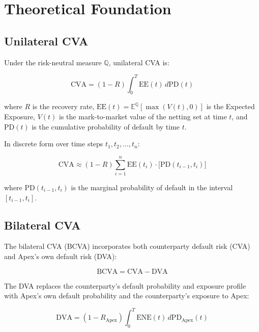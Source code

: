 \documentclass[11pt,a4paper]{article}
\begin{document}
\section{Theoretical Foundation}

\subsection{Unilateral CVA}

Under the risk-neutral measure $\mathbb{Q}$, unilateral CVA is:

\begin{equation}
  \text{CVA} = (1 - R) \int_0^T \text{EE}(t)\, d\text{PD}(t)
  \label{eq:cva_continuous}
\end{equation}

where $R$ is the recovery rate, $\text{EE}(t) = \mathbb{E}^{\mathbb{Q}}[\max(V(t), 0)]$
is the Expected Exposure, $V(t)$ is the mark-to-market value of the netting
set at time $t$, and $\text{PD}(t)$ is the cumulative probability of default
by time $t$.

In discrete form over time steps $t_1, t_2, \ldots, t_n$:

\begin{equation}
  \text{CVA} \approx (1 - R) \sum_{i=1}^{n} \text{EE}(t_i)
    \cdot \bigl[\text{PD}(t_{i-1}, t_i)\bigr]
  \label{eq:cva_discrete}
\end{equation}

where $\text{PD}(t_{i-1}, t_i)$ is the marginal probability of default in the
interval $[t_{i-1}, t_i]$.

\subsection{Bilateral CVA}

The bilateral CVA (BCVA) incorporates both counterparty default risk (CVA)
and Apex's own default risk (DVA):

\begin{equation}
  \text{BCVA} = \text{CVA} - \text{DVA}
  \label{eq:bcva}
\end{equation}

The DVA replaces the counterparty's default probability and exposure profile
with Apex's own default probability and the counterparty's exposure to Apex:

\begin{equation}
  \text{DVA} = (1 - R_{\text{Apex}}) \int_0^T \text{ENE}(t)\, d\text{PD}_{\text{Apex}}(t)
  \label{eq:dva}
\end{equation}
\end{document}
